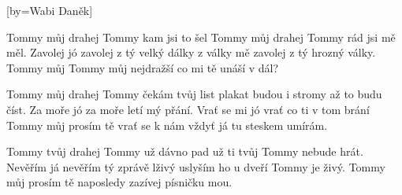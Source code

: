 [by={Wabi Daněk}]

\beginverse{}
Tommy můj drahej Tommy kam jsi to šel
Tommy můj drahej Tommy rád jsi mě měl.
Zavolej jó zavolej z tý velký dálky
z války mě zavolej z tý hrozný války.
Tommy můj Tommy můj nejdražší
co mi tě unáší v dál?
\endverse{}

\beginverse{}
Tommy můj drahej Tommy čekám tvůj list
plakat budou i stromy až to budu číst.
Za moře jó za moře letí mý přání.
Vrať se mi jó vrať co ti v tom brání
Tommy můj prosím tě vrať se k nám
vždyť já tu steskem umírám.
\endverse{}

\beginverse{}
Tommy tvůj drahej Tommy už dávno pad
už ti tvůj Tommy nebude hrát.
Nevěřím já nevěřím tý zprávě lživý
uslyším ho u dveří Tommy je živý.
Tommy můj prosím tě naposledy
zazívej písničku mou.
\endverse{}

\endsong{}
